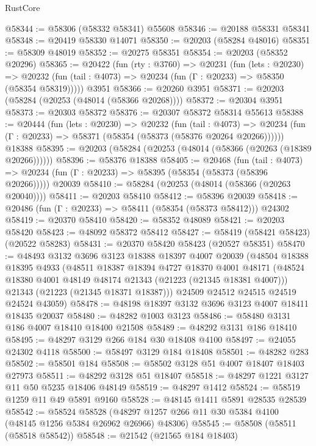 \begin{lexlean}{RustCore}
\begin{coremodule}
@58344 := @58306 (@58332 @58341) @55608
@58346 := @20188 @58331 @58341
@58348 := @20419 @58330 @14071
@58350 := @20203 (@58284 @48016)
@58351 := @58309 @48019
@58352 := @20275 @58351
@58354 := @20203 (@58352 @20296)
@58365 := @20422
    (fun (rty : @3760) =>
    @20231
      (fun (lets : @20230) =>
      @20232 (fun (tail : @4073) => @20234 (fun (Γ : @20233) => @58350 (@58354 @58319)))))
    @3951
@58366 := @20260 @3951
@58371 := @20203 (@58284 (@20253 (@48014 (@58366 @20268))))
@58372 := @20304 @3951
@58373 := @20303 @58372
@58376 := @20307 @58372 @58314 @55613
@58388 := @20444
    (fun (lets : @20230) =>
    @20232
      (fun (tail : @4073) =>
      @20234 (fun (Γ : @20233) => @58371 (@58354 (@58373 (@58376 @20264 @20266))))))
    @18388
@58395 := @20203 (@58284 (@20253 (@48014 (@58366 (@20263 (@18389 @20266))))))
@58396 := @58376 @18388
@58405 := @20468
    (fun (tail : @4073) => @20234 (fun (Γ : @20233) => @58395 (@58354 (@58373 (@58396 @20266)))))
    @20039
@58410 := @58284 (@20253 (@48014 (@58366 (@20263 @20040))))
@58411 := @20203 @58410
@58412 := @58396 @20039
@58418 := @20486 (fun (Γ : @20233) => @58411 (@58354 (@58373 @58412))) @24302
@58419 := @20370 @58410
@58420 := @58352 @48089
@58421 := @20203 @58420
@58423 := @48092 @58372 @58412
@58427 := @58419 (@58421 @58423) (@20522 @58283)
@58431 := @20370 @58420 @58423 (@20527 @58351)
@58470 := @48493
    @3132
    @3696
    @3123
    @18388
    @18397
    @4007
    @20039
    (@48504
      @18388
      @18395
      @4933
      (@48511
        @18387
        @18394
        @4727
        @18370
        @4001
        @48171
        (@48524 @18380 @4001 @48149 @48174 @21343 (@21223 (@21345 @18381 @4007)))
        @21343
        (@21223 (@21345 @18371 @18387)))
      @24509
      @24512
      @24515
      @24519
      @24524
      @43059)
@58478 := @48198 @18397 @3132 @3696 @3123 @4007 @18411 @18435 @20037
@58480 := @48282 @1003 @3123
@58486 := @58480 @3131 @186 @4007 @18410 @18400 @21508
@58489 := @48292 @3131 @186 @18410
@58495 := @48297 @3129 @266 @184 @30 @18408 @4100
@58497 := @24055 @24302 @4118
@58500 := @58497 @3129 @184 @18408
@58501 := @48282 @283
@58502 := @58501 @184
@58508 := @58502 @3128 @51 @4007 @18407 @18403 @27973
@58511 := @48292 @3128 @51 @18407
@58518 := @48297 @1221 @3127 @11 @50 @5235 @18406 @48149
@58519 := @48297 @1412
@58524 := @58519 @1259 @11 @49 @5891 @9160
@58528 := @48145 @1411 @5891 @28535 @28539
@58542 := @58524
    @58528
    (@48297 @1257 @266 @11 @30 @5384 @4100 (@48145 @1256 @5384 @26962 @26966) @48306)
@58545 := @58508 (@58511 (@58518 @58542))
@58548 := @21542 (@21565 @184 @18403)

\end{coremodule}
\end{lexlean}
